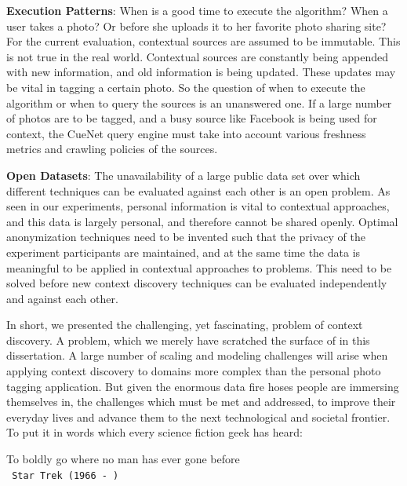\textbf{\textbf{Execution Patterns}}: When is a good time to execute the algorithm? When a user takes a photo? Or before she uploads it to her favorite photo sharing site? For the current evaluation, contextual sources are assumed to be immutable. This is not true in the real world. Contextual sources are constantly being appended with new information, and old information is being updated. These updates may be vital in tagging a certain photo. So the question of when to execute the algorithm or when to query the sources is an unanswered one. If a large number of photos are to be tagged, and a busy source like Facebook is being used for context, the CueNet query engine must take into account various freshness metrics and crawling policies of the sources. 

\textbf{\textbf{Open Datasets}}: The unavailability of a large public data set over which different techniques can be evaluated against each other is an open problem. As seen in our experiments, personal information is vital to contextual approaches, and this data is largely personal, and therefore cannot be shared openly. Optimal anonymization techniques need to be invented such that the privacy of the experiment participants are maintained, and at the same time the data is meaningful to be applied in contextual approaches to problems. This need to be solved before new context discovery techniques can be evaluated independently and against each other.

In short, we presented the challenging, yet fascinating, problem of context discovery.  A problem, which we merely have scratched the surface of in this dissertation. A large number of scaling and modeling challenges will arise when applying context discovery to domains more complex than the personal photo tagging application. But given the enormous data fire hoses people are immersing themselves in, the challenges which must be met and addressed, to improve their everyday lives and advance them to the next technological and societal frontier. To put it in words which every science fiction geek has heard:

\centering
To boldly go where no man has ever gone before \\
\setlength{\parindent}{12cm} \texttt{ Star Trek (1966 - ) } 